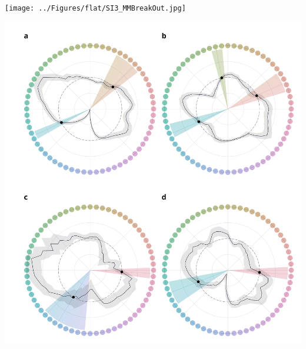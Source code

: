 \begin{appendixbox}
        \texttt{[image: ../Figures/flat/SI3\_MMBreakOut.jpg]}
        \label{fig:MMBreakOut}
\end{appendixbox}

\begin{appendixbox}
        \includegraphics[width=\textwidth]{../Figures/flat/SI4_MM.jpg}
        \label{fig:MM}
\end{appendixbox}

